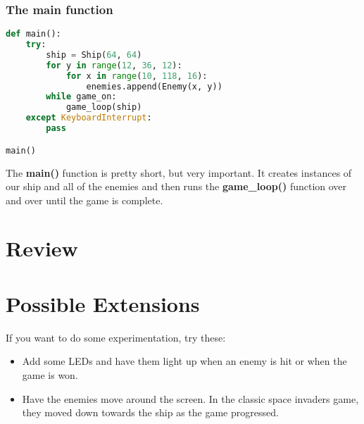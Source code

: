 \subsubsection{The main function}
\begin{lstlisting}[language=Python,caption=The main function]
    def main():
    try:
        ship = Ship(64, 64)
        for y in range(12, 36, 12):
            for x in range(10, 118, 16):
                enemies.append(Enemy(x, y))
        while game_on:
            game_loop(ship)
    except KeyboardInterrupt:
        pass

main()
\end{lstlisting}

The \textbf{main()} function is pretty short, but very important. It creates instances of our ship and all
of the enemies and then runs the \textbf{game\_loop()} function over and over until the game is complete.

\section{Review}

\section{Possible Extensions}
If you want to do some experimentation, try these:

\begin{itemize}
    \item Add some LEDs and have them light up when an enemy is hit or when the game is won.
    \item Have the enemies move around the screen. In the classic space invaders game, they moved down towards the ship as the game progressed.
\end{itemize}
